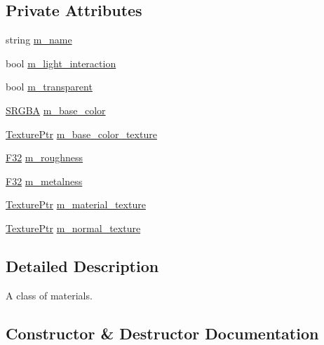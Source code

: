\subsection*{Private Attributes}
\begin{DoxyCompactItemize}
\item 
string \hyperlink{classmage_1_1rendering_1_1_material_a16f309220930c59f17b25fd8b0b62446}{m\+\_\+name}
\item 
bool \hyperlink{classmage_1_1rendering_1_1_material_aff4d7ceba071ecc00efa4188d7c22a46}{m\+\_\+light\+\_\+interaction}
\item 
bool \hyperlink{classmage_1_1rendering_1_1_material_af9f8d0fdb613bce1a4c3683836649bf3}{m\+\_\+transparent}
\item 
\hyperlink{structmage_1_1_s_r_g_b_a}{S\+R\+G\+BA} \hyperlink{classmage_1_1rendering_1_1_material_ad51c1da4673a012737ffa9feb14b3565}{m\+\_\+base\+\_\+color}
\item 
\hyperlink{namespacemage_1_1rendering_a6f3ae54f825328465b0cdde0f0de4a36}{Texture\+Ptr} \hyperlink{classmage_1_1rendering_1_1_material_aaee7a296b1f966a1544a07d21e13b8f6}{m\+\_\+base\+\_\+color\+\_\+texture}
\item 
\hyperlink{namespacemage_aa97e833b45f06d60a0a9c4fc22ae02c0}{F32} \hyperlink{classmage_1_1rendering_1_1_material_a14b420a0bdb8cb1f0fa57aa31bd09ae1}{m\+\_\+roughness}
\item 
\hyperlink{namespacemage_aa97e833b45f06d60a0a9c4fc22ae02c0}{F32} \hyperlink{classmage_1_1rendering_1_1_material_a1ec138a6dfec09ac421517480bd08a75}{m\+\_\+metalness}
\item 
\hyperlink{namespacemage_1_1rendering_a6f3ae54f825328465b0cdde0f0de4a36}{Texture\+Ptr} \hyperlink{classmage_1_1rendering_1_1_material_a4292698d8326e4f28dc45d59e00296dd}{m\+\_\+material\+\_\+texture}
\item 
\hyperlink{namespacemage_1_1rendering_a6f3ae54f825328465b0cdde0f0de4a36}{Texture\+Ptr} \hyperlink{classmage_1_1rendering_1_1_material_a14911430f38bc998c6d0735dc129f234}{m\+\_\+normal\+\_\+texture}
\end{DoxyCompactItemize}


\subsection{Detailed Description}
A class of materials. 

\subsection{Constructor \& Destructor Documentation}
\hypertarget{classmage_1_1rendering_1_1_material_a0d23055b62f54a28c77010412099a446}{}\label{classmage_1_1rendering_1_1_material_a0d23055b62f54a28c77010412099a446} 
